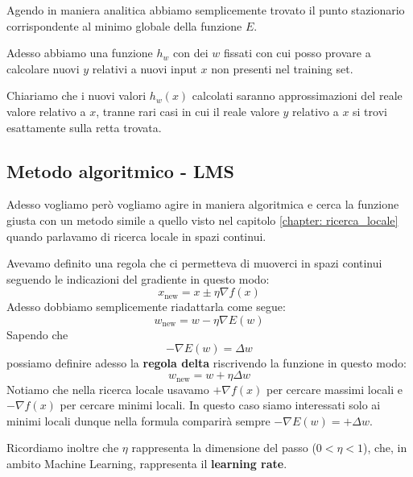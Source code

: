 Agendo in maniera analitica abbiamo semplicemente trovato il punto stazionario corrispondente al minimo globale della
funzione $E$.

Adesso abbiamo una funzione $h_w$ con dei $w$ fissati con cui posso provare a calcolare nuovi $y$ relativi a nuovi
input $x$ non presenti nel training set.

Chiariamo che i nuovi valori $h_w(x)$ calcolati saranno approssimazioni del reale valore relativo a $x$, tranne rari casi
in cui il reale valore $y$ relativo a $x$ si trovi esattamente sulla retta trovata.

\subsection{Metodo algoritmico - LMS}
Adesso vogliamo per\`o vogliamo agire in maniera algoritmica e cerca la funzione giusta con un metodo simile a quello
visto nel capitolo \ref{chapter: ricerca_locale} quando parlavamo di ricerca locale in spazi continui.

Avevamo definito una regola che ci permetteva di muoverci in spazi continui seguendo le indicazioni del gradiente in questo
modo:
\[ x_{\text{new}} = x \pm \eta \nabla f(x) \]
Adesso dobbiamo semplicemente riadattarla come segue:
\[ w_{\text{new}} = w - \eta \nabla E(w) \]
Sapendo che
\[ -\nabla E(w) = \Delta w \]
possiamo definire adesso la \textbf{regola delta} riscrivendo la funzione in questo modo:
\[ w_{\text{new}} = w + \eta \Delta w \]
Notiamo che nella ricerca locale usavamo $+\nabla f(x)$ per cercare massimi locali e $-\nabla f(x)$ per cercare minimi
locali. In questo caso siamo interessati solo ai minimi locali dunque nella formula comparir\`a sempre
$-\nabla E(w) = +\Delta w$.

Ricordiamo inoltre che $\eta$ rappresenta la dimensione del passo ($0 < \eta < 1$), che, in ambito Machine Learning,
rappresenta il \textbf{learning rate}.

